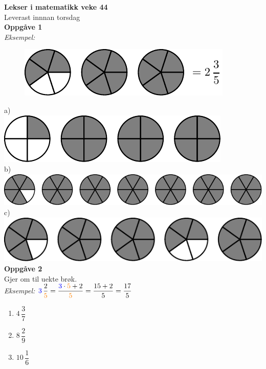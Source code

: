 \documentclass[english,hidelinks,pdftex, 11 pt, class=report,crop=false]{standalone}
\begin{document}
\huge \textbf{Lekser i matematikk veke 44}\\
\normalsize Leverast innnan torsdag
 \\[25pt]
\large
{\Large \textbf{Oppgåve 1}}\\[10pt]
\textit{Eksempel:}
\begin{figure}
	\includegraphics[]{bra}
\end{figure}
a) \\\includegraphics[]{brb} \\
b) \\\includegraphics[]{brc}
c) \\\includegraphics[]{brd}
\\[25pt]
{\Large \textbf{Oppgåve 2}}\\[10pt]
Gjer om til uekte brøk.\\[5pt]
\textit{Eksempel:} $ \displaystyle {\color{blue}3}\,\frac{2}{\color{orange}5}=\frac{{\color{blue}3}\cdot{\color{orange}5}+2}{\color{orange}5}=\frac{15+2}{5}=\frac{17}{5} $
\begin{enumerate}[label=\alph*)]
	\item $ 4\,\dfrac{3}{7} $ \\[5pt]
	\item $ 8\,\dfrac{2}{9} $ \\[5pt]
	\item $ 10\,\dfrac{1}{6} $ \\[5pt]	
	
	
\end{enumerate}
\end{document}
